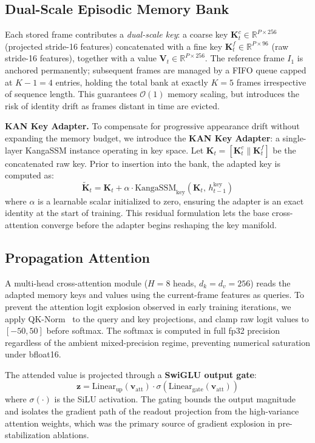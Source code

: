 \documentclass[sigconf]{acmart}
\begin{document}
\subsection{Dual-Scale Episodic Memory Bank}
\label{sec:memory}
Each stored frame contributes a \emph{dual-scale key}: a coarse key $\mathbf{K}^c_t \in \mathbb{R}^{P \times 256}$ (projected stride-16 features) concatenated with a fine key $\mathbf{K}^f_t \in \mathbb{R}^{P \times 96}$ (raw stride-16 features), together with a value $\mathbf{V}_t \in \mathbb{R}^{P \times 256}$. The reference frame $I_1$ is anchored permanently; subsequent frames are managed by a FIFO queue capped at $K-1=4$ entries, holding the total bank at exactly $K=5$ frames irrespective of sequence length. This guarantees $\mathcal{O}(1)$ memory scaling, but introduces the risk of identity drift as frames distant in time are evicted.

\textbf{KAN Key Adapter.} To compensate for progressive appearance drift without expanding the memory budget, we introduce the \textbf{KAN Key Adapter}: a single-layer KangaSSM instance operating in key space. Let $\mathbf{K}_t = [\mathbf{K}^c_t \| \mathbf{K}^f_t]$ be the concatenated raw key. Prior to insertion into the bank, the adapted key is computed as:
\begin{equation}
    \tilde{\mathbf{K}}_t = \mathbf{K}_t + \alpha \cdot \text{KangaSSM}_\text{key}(\mathbf{K}_t,\, h^\text{key}_{t-1})
    \label{eq:key_adapter}
\end{equation}
where $\alpha$ is a learnable scalar initialized to zero, ensuring the adapter is an exact identity at the start of training. This residual formulation lets the base cross-attention converge before the adapter begins reshaping the key manifold.

\subsection{Propagation Attention}
\label{sec:attention}
A multi-head cross-attention module ($H=8$ heads, $d_k = d_v = 256$) reads the adapted memory keys and values using the current-frame features as queries. To prevent the attention logit explosion observed in early training iterations, we apply QK-Norm~\cite{henry2020querykey} to the query and key projections, and clamp raw logit values to $[-50, 50]$ before softmax. The softmax is computed in full fp32 precision regardless of the ambient mixed-precision regime, preventing numerical saturation under bfloat16.

The attended value is projected through a \textbf{SwiGLU output gate}:
\begin{equation}
    \mathbf{z} = \mathrm{Linear}_\text{up}(\mathbf{v}_\text{att}) \cdot \sigma\!\left(\mathrm{Linear}_\text{gate}(\mathbf{v}_\text{att})\right)
    \label{eq:swiglu}
\end{equation}
where $\sigma(\cdot)$ is the SiLU activation. The gating bounds the output magnitude and isolates the gradient path of the readout projection from the high-variance attention weights, which was the primary source of gradient explosion in pre-stabilization ablations.
\end{document}
